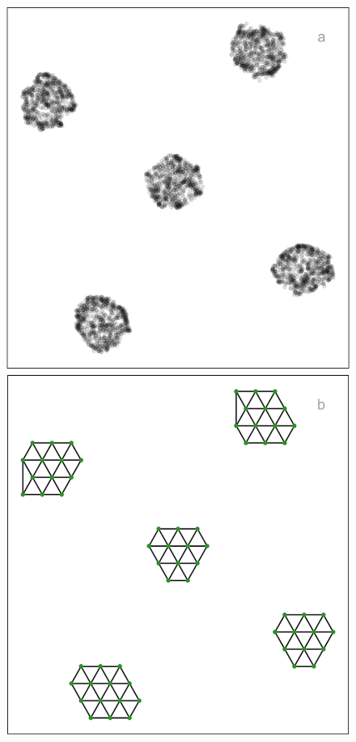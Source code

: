 \documentclass[
  12pt]{article}
\begin{document}
\begin{figure}[H]

\begin{minipage}{0.33\linewidth}
\includegraphics{figures/five_gau_clusters/pacmap_layout.png}\end{minipage}%
%
\begin{minipage}{0.33\linewidth}
\includegraphics{figures/five_gau_clusters/2d_model_pacmap.png}\end{minipage}%

\end{figure}
\end{document}
